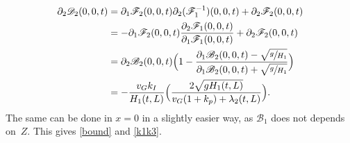\documentclass[11pt]{article}
\numberwithin{equation}{section}
\let\mathcal\mathscr
\theoremstyle{definition}
\begin{document}
\begin{equation*}
\begin{split}
\partial_{2}\mathcal{D}_{2}(0,0,t)&=\partial_{1}\mathcal{F}_{2}(0,0,t)\partial_{2}(\mathcal{F}_{1}^{-1})(0,0,t)+\partial_{2}\mathcal{F}_{2}(0,0,t)\\
&=-\partial_{1}\mathcal{F}_{2}(0,0,t)\frac{\partial_{2}\mathcal{F}_{1}(0,0,t)}{\partial_{1}\mathcal{F}_{1}(0,0,t)}+\partial_{2}\mathcal{F}_{2}(0,0,t)\\
&=\partial_{2}\mathcal{B}_{2}(0,0,t)\Bigl(1-\frac{\partial_{1}\mathcal{B}_{2}(0,0,t)-\sqrt{\sfrac{g}{H_{1}}}}{\partial_{1}\mathcal{B}_{2}(0,0,t)+\sqrt{\sfrac{g}{H_{1}}}}\Bigr)\\
&=-\frac{v_{G}k_{I}}{H_{1}(t,L)} \Bigl(\frac{2\sqrt{gH_{1}(t,L)}}{v_{G}(1+k_{p})+\lambda_{2}(t,L)} \Bigr).
\end{split}
\end{equation*}
The same can be done in $x=0$ in a slightly easier way, as $\mathcal{B}_{1}$ does not depends on~$Z$. This gives \eqref{bound} and \eqref{k1k3}.
\end{document}
